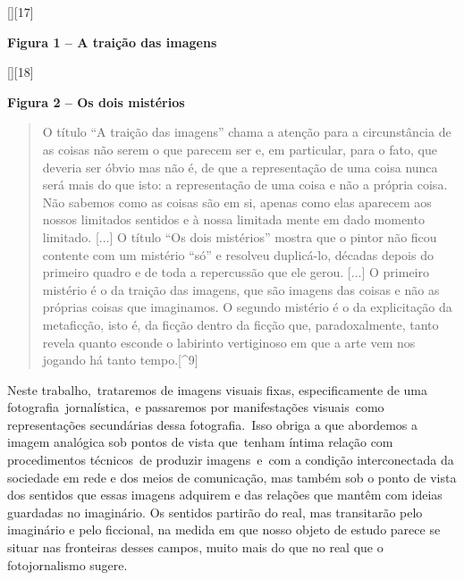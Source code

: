 \documentclass[
  letterpaper,
]{scrbook}
\begin{document}
{[}{]}{[}17{]}

\protect\hypertarget{_Toc507740886}{}{}\textbf{Figura 1 -- A traição das
imagens}

{[}{]}{[}18{]}

\protect\hypertarget{_Toc507740887}{}{}\textbf{Figura 2 -- Os dois
mistérios}

\begin{quote}
O título ``A traição das imagens'' chama a atenção para a circunstância
de as coisas não serem o que parecem ser e, em particular, para o fato,
que deveria ser óbvio mas não é, de que a representação de uma coisa
nunca será mais do que isto: a representação de uma coisa e não a
própria coisa. Não sabemos como as coisas são em si, apenas como elas
aparecem aos nossos limitados sentidos e à nossa limitada mente em dado
momento limitado. {[}...{]} O título ``Os dois mistérios'' mostra que o
pintor não ficou contente com um mistério ``só'' e resolveu duplicá-lo,
décadas depois do primeiro quadro e de toda a repercussão que ele gerou.
{[}...{]} O primeiro mistério é o da traição das imagens, que são
imagens das coisas e não as próprias coisas que imaginamos. O segundo
mistério é o da explicitação da metaficção, isto é, da ficção dentro da
ficção que, paradoxalmente, tanto revela quanto esconde o labirinto
vertiginoso em que a arte vem nos jogando há tanto tempo.{[}\^{}9{]}
\end{quote}

Neste trabalho,~trataremos de imagens visuais fixas, especificamente de
uma fotografia~jornalística,~e passaremos por manifestações visuais~como
representações secundárias dessa fotografia.~Isso obriga a que abordemos
a imagem analógica sob pontos de vista que~tenham íntima relação com
procedimentos técnicos~de produzir imagens~e~com a condição
interconectada da sociedade em rede e dos meios de comunicação, mas
também sob o ponto de vista dos sentidos que essas imagens adquirem e
das relações que mantêm com ideias guardadas no imaginário. Os sentidos
partirão do real, mas transitarão pelo imaginário e pelo ficcional, na
medida em que nosso objeto de estudo parece se situar nas fronteiras
desses campos, muito mais do que no real que o fotojornalismo sugere.
\end{document}
